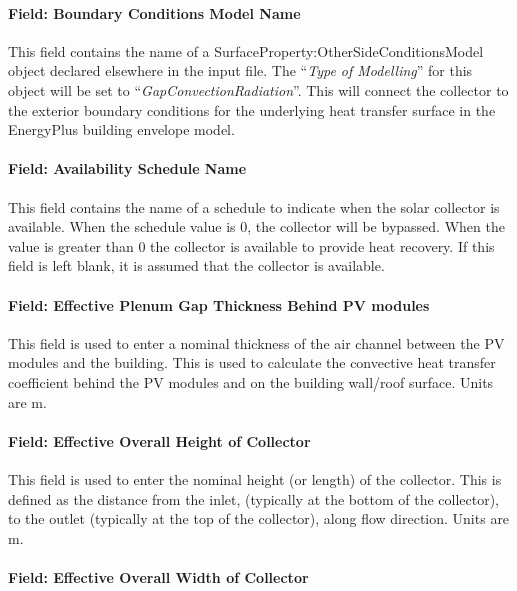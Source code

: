 \paragraph{Field: Boundary Conditions Model Name}\label{BIPVT-field-BC}

This field contains the name of a SurfaceProperty:OtherSideConditionsModel object declared elsewhere in the input file. The “\textit{Type of Modelling}” for this object will be set to “\textit{GapConvectionRadiation}”. This will connect the collector to the exterior boundary conditions for the underlying heat transfer surface in the EnergyPlus building envelope model.

\paragraph{Field: Availability Schedule Name}\label{BIPVT-field-Sched}

This field contains the name of a schedule to indicate when the solar collector is available. When the schedule value is 0, the collector will be bypassed. When the value is greater than 0 the collector is available to provide heat recovery. If this field is left blank, it is assumed that the collector is available.

\paragraph{Field: Effective Plenum Gap Thickness Behind PV modules}\label{BIPVT-field-Gap}

This field is used to enter a nominal thickness of the air channel between the PV modules and the building. This is used to calculate the convective heat transfer coefficient behind the PV modules and on the building wall/roof surface. Units are m. 

\paragraph{Field: Effective Overall Height of Collector}\label{BIPVT-field-Height}

This field is used to enter the nominal height (or length) of the collector. This is defined as the distance from the inlet, (typically at the bottom of the collector), to the outlet (typically at the top of the collector), along flow direction. Units are m.

\paragraph{Field: Effective Overall Width of Collector}\label{BIPVT-field-Width}

